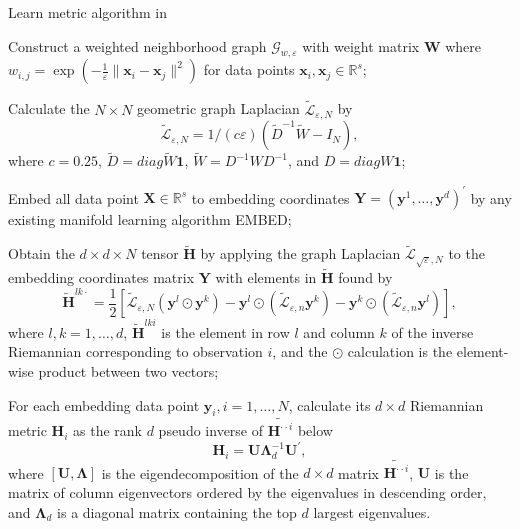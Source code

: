 \documentclass[
]{article}
\begin{document}
\begin{algorithm}[!htb]
  \caption{Learn metric algorithm in \cite{Perrault-Joncas2013-pq} }
  \label{alg:learnmetric}
  \DontPrintSemicolon
  \SetAlgoLined
  \BlankLine
  \begin{algorithmic}[1]

  \STATE Construct a weighted neighborhood graph $\mathcal{G}_{w,\varepsilon}$ with weight matrix $\bm{W}$ where $w_{i,j}=\exp(-\frac{1}{\varepsilon}\|\bm{x}_i-\bm{x}_j\|^2)$ for data points $\bm{x}_i,\bm{x}_j \in \mathbb{R}^s$;

  \STATE Calculate the $N\times N$ geometric graph Laplacian $\widetilde{\mathcal{L}}_{\varepsilon,N}$ by
  $$
  \widetilde{\mathcal{L}}_{\varepsilon,N} = 1/(c\varepsilon)(\widetilde{D}^{-1} \widetilde{W} - I_N),
  $$
  where $c=0.25$, $\widetilde{D}=diag{\widetilde{W}\bm{1}}$, $\widetilde{W} = D^{-1}WD^{-1}$, and $D = diag{W\bm{1}}$;

  \STATE Embed all data point $\bm{X}\in \mathbb{R}^s$ to embedding coordinates $\bm{Y}=(\bm{y}^1,\dots,\bm{y}^d)^\prime$ by any existing manifold learning algorithm EMBED;

  \STATE Obtain the $d\times d\times N$ tensor $\bm{\tilde{H}}$ by applying the graph Laplacian $\widetilde{\mathcal{L}}_{\sqrt{\varepsilon},N}$ to the embedding coordinates matrix $\bm{Y}$ with elements in $\bm{\tilde{H}}$ found by
  $$
    \bm{\tilde{H}}^{lk \cdot} = \frac{1}{2} \left[\tilde{\mathcal{L}}_{\varepsilon, N}\left(\bm{y}^l \odot \bm{y}^k\right) - \bm{y}^l \odot\left(\tilde{\mathcal{L}}_{\varepsilon, n} \bm{y}^k\right) - \bm{y}^k \odot\left(\tilde{\mathcal{L}}_{\varepsilon, n} \bm{y}^l\right)\right],
  $$
  where $l,k=1,\dots,d$, $\bm{\tilde{H}}^{lki}$ is the element in row $l$ and column $k$ of the inverse Riemannian corresponding to observation $i$, and the $\odot$ calculation is the element-wise product between two vectors;

  \STATE For each embedding data point $\bm{y}_i, i=1,\dots,N$, calculate its $d\times d$ Riemannian metric $\bm{H}_i$ as the rank $d$ pseudo inverse of $\tilde{\bm{H}^{\cdot\cdot i}}$ below
  $$
    \bm{H}_i = \bm{U} \bm{\Lambda}_d^{-1} \bm{U}^\prime,
  $$
  where $[\bm{U}, \bm{\Lambda}]$ is the eigendecomposition of the $d\times d$ matrix $\tilde{\bm{H}^{\cdot\cdot i}}$, $\bm{U}$ is the matrix of column eigenvectors ordered by the eigenvalues in descending order, and $\bm{\Lambda}_d$ is a diagonal matrix containing the top $d$ largest eigenvalues.

  \end{algorithmic}
\end{algorithm}
\end{document}
